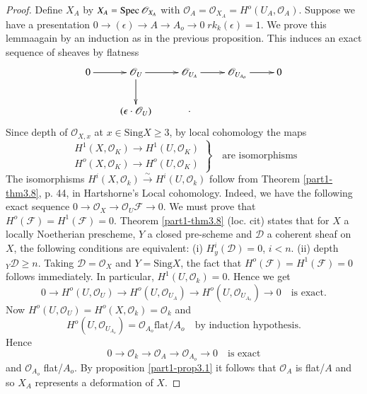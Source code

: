 {\begin{proof}
Define $X_A$ by $X_A=\operatorname{Spec} \mathscr{O}_{X_{A}}$ with
$\mathscr{O}_{A}=\mathscr{O}_{X_{A}}=H^{o}(U_A, \mathscr{O}_{A})$. Suppose
we have a presentation $0\to (\epsilon)\to A \to A_o\to 0 \; 
rk_k(\epsilon)=1$. We prove this lemma\pageoriginale again by an
induction as in the previous proposition. This induces an exact
sequence of sheaves by flatness 
\begin{equation*}
\xymatrix{
0\ar[r]& \mathscr{O}_{U}\ar@ [\wr][d]\ar [r]& \mathscr{O}_{U_{A}}\ar
[r]& \mathscr{O}_{U_{A_{o}}}\ar[r]& 0\\ 
& (\epsilon\cdot \mathscr{O}_{U})&\cdot &\\
}
\end{equation*}
Since depth of $\mathscr{O}_{X, x}$ at $x\in \text{Sing} X \ge 3$, by local cohomology the maps
\begin{equation*}
\left.
\begin{aligned}
H^{1}(X, \mathscr{O}_{K})\to H^{1}(U, \mathscr{O}_{K}) \\
H^{o}(X, \mathscr{O}_{K})\to H^{o}(U, \mathscr{O}_{K})
\end{aligned}
\right\}
\quad\text{are isomorphisms}
\end{equation*}
The isomorphisms $H^{i}(X, \mathscr{O}_k)\xrightarrow{\sim}
H^{i}(U, \mathscr{O}_k)$ follow from Theorem \ref{part1-thm3.8},
p. 44, in Hartshorne's Local cohomology. Indeed, we have the following
exact sequence $0\to \mathscr{O}_{X}\to \mathscr{O}_{U}\mathscr{F}\to
0$. We must prove that
$H^{o}(\mathscr{F})=H^{1}(\mathscr{F})=0$. Theorem \ref{part1-thm3.8}
(loc. cit) states that for $X$ a locally Noetherian prescheme, $Y$ a
closed pre-scheme and $\mathscr{D}$ a coherent sheaf on $X$, the
following conditions are equivalent: (i) $H^{i}_y(\mathscr{D})=0$,
$i<n$. (ii) depth$_{Y}\mathscr{D}\ge n$. Taking
$\mathscr{D}=\mathscr{O}_X$ and $Y=\text{Sing}X$, the fact that
$H^{o}(\mathscr{F})=H^{1}(\mathscr{F})=0$ follows immediately. In
particular, $H^{1}(U, \mathscr{O}_k)=0$. Hence we get 
\begin{equation*}
0\to H^{o}(U, \mathscr{O}_{U})\to H^{o}(U, \mathscr{O}_{U_{A}})\to
H^{o}(U, \mathscr{O}_{U_{A_{o}}})\to 0\quad\text{is exact}. 
\end{equation*}
Now $H^{o}(U, \mathscr{O}_{U})=H^{o}(X, \mathscr{O}_{k})=\mathscr{O}_{k}$
and 
$$
H^{o}(U, \mathscr{O}_{U_{A_{o}}})=\mathscr{O}_{A_{o}}\text{flat}/A_o\quad\text{by induction hypothesis}.
$$
Hence\pageoriginale
$$
0\to \mathscr{O}_{k}\to \mathscr{O}_{A}\to \mathscr{O}_{A_{o}}\to 0\quad\text{is exact}
$$
and $\mathscr{O}_{A_{o}}$ flat/$A_{o}$. By
proposition \ref{part1-prop3.1} it follows that $\mathscr{O}_A$ is
flat/$A$ and so $X_A$ represents a deformation of $X$.  
\end{proof}

}
